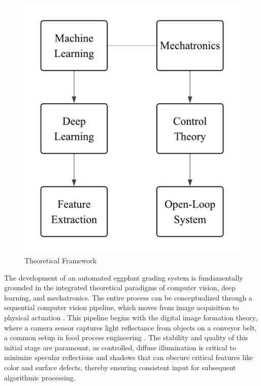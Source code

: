 {\begin{figure}[h]
	\centering
	\includegraphics[height=0.4\textheight]{figures/theoreticaldiagram}
	\caption{Theoretical Framework}
	\label{fig:theoreticalframework}
\end{figure}

The development of an automated eggplant grading system is fundamentally grounded in the integrated theoretical paradigms of computer vision, deep learning, and mechatronics. The entire process can be conceptualized through a sequential computer vision pipeline, which moves from image acquisition to physical actuation \citep{szeliski2022computer}. This pipeline begins with the digital image formation theory, where a camera sensor captures light reflectance from objects on a conveyor belt, a common setup in food process engineering \citep{dougherty2020digital}. The stability and quality of this initial stage are paramount, as controlled, diffuse illumination is critical to minimize specular reflections and shadows that can obscure critical features like color and surface defects, thereby ensuring consistent input for subsequent algorithmic processing.

}

